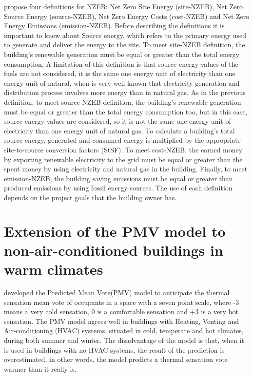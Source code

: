 \citep{} propose four definitions for NZEB: Net Zero Site Energy (site-NZEB), Net Zero Source Energy (source-NZEB), Net Zero Energy Costs (cost-NZEB) and Net Zero Energy Emissions (emission-NZEB). Before describing the definitions it is important to know about Source energy, which refers to the primary energy used to generate and deliver the energy to the site. To meet site-NZEB definition, the building's renewable generation must be equal or greater than the total energy consumption. A limitation of this definition is that source energy values of the fuels are not considered, it is the same one energy unit of electricity than one energy unit of natural, when is very well known that electricity generation and distribution process involves more energy than in natural gas. As in the previous definition, to meet source-NZEB definition, the building's renewable generation must be equal or greater than the total energy consumption too, but in this case, source energy values are considered, so it is not the same one energy unit of electricity than one energy unit of natural gas. To calculate a building's total source energy, generated and consumed energy is multiplied by the appropriate site-to-source conversion factors (StSF). To meet cost-NZEB, the earned money by exporting renewable electricity to the grid must be equal or greater than the spent money by using electricity and natural gas in the building. Finally, to meet emission-NZEB, the building saving emissions must be equal or greater than produced emissions by using fossil energy sources. The use of each definition depends on the project goals that the building owner has. 



\section{Extension of the PMV model to non-air-conditioned buildings in warm climates}
\citep{} developed the Predicted Mean Vote(PMV) model to anticipate the thermal sensation mean vote of occupants in a space with a seven point scale, where -3 means a very cold sensation, 0 is a comfortable sensation and +3 is a very hot sensation. The PMV model agrees well in buildings with Heating, Venting and Air-conditioning (HVAC) systems, situated in cold, temperate and hot climates, during both summer and winter. The disadvantage of the model is that, when it is used in buildings with no HVAC systems, the result of the prediction is overestimated, in other words, the model predicts a thermal sensation vote warmer than it really is.

